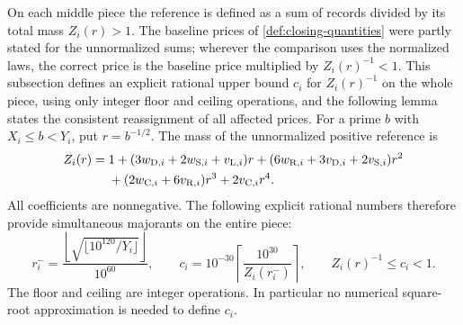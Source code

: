 On each middle piece the reference is defined as a sum of records
divided by its total mass $Z_i(r)>1$. The baseline prices of
\cref{def:closing-quantities} were partly stated for the
unnormalized sums; wherever the comparison uses the normalized
laws, the correct price is the baseline price multiplied by
$Z_i(r)^{-1}<1$. This subsection defines an explicit rational
upper bound $c_i$ for $Z_i(r)^{-1}$ on the whole piece, using only
integer floor and ceiling operations, and the following lemma
states the consistent reassignment of all affected prices.
For a prime $b$ with $X_i\le b<Y_i$, put $r=b^{-1/2}$. The mass of the
unnormalized positive reference is
\begin{align*}
 Z_i(r)={}&1+(3w_{{\rm D},i}+2w_{{\rm S},i}+v_{{\rm L},i})r
 +(6w_{{\rm R},i}+3v_{{\rm D},i}+2v_{{\rm S},i})r^2\\
 &+(2w_{{\rm C},i}+6v_{{\rm R},i})r^3+2v_{{\rm C},i}r^4.
\end{align*}
All coefficients are nonnegative. The following explicit rational numbers
therefore provide simultaneous majorants on the entire piece:
\begin{equation}\label{eq:four-routes-normalizer}
 r_i^-=\frac{\left\lfloor\sqrt{\lfloor10^{120}/Y_i\rfloor}\right\rfloor}{10^{60}},
 \qquad c_i=10^{-30}\left\lceil \frac{10^{30}}{Z_i(r_i^-)}\right\rceil,
 \qquad Z_i(r)^{-1}\le c_i<1.
\end{equation}
The floor and ceiling are integer operations. In particular no numerical
square-root approximation is needed to define $c_i$.

